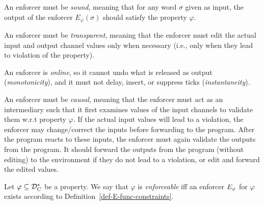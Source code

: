 \squishlist
\item An enforcer must be \textit{sound}, meaning that for any word $\sigma$ given as input, the output of the enforcer $E_\varphi\left(\sigma \right)$ should satisfy the property $\varphi$.
\item An enforcer must be \textit{transparent}, meaning that the enforcer must edit the actual input and output channel values only when necessary (i.e., only when they lead to violation of the property).
\item An enforcer is \textit{online}, so it cannot undo what is released as output (\textit{monotonicity}), and it must not delay, insert, or suppress ticks (\textit{instantaneity}).
\item An enforcer must be \textit{causal}, meaning that the enforcer must act as an intermediary such
that it first examines values of the input channels to validate them w.r.t property $\varphi$. If the actual input values will lead to a violation, the enforcer may change/correct the inputs before
forwarding to the program. After the program reacts to these inputs, the enforcer must again validate the outputs from the program. It should forward the outputs from the program (without editing) to the environment if they do not lead to a violation, or edit and forward the edited values.  
\squishend
\begin{definition}[Enforceability]
	Let $\varphi\subseteq{\mathcal D}_C^*$ be a property. We say that $\varphi$ is {\em enforceable} iff an enforcer $E_{\varphi}$ for $\varphi$ exists according to Definition~\ref{def-E-func-constraints}.
\end{definition}




